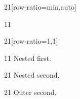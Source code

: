\documentclass[paper=A4]{ropas-poster}
\begin{document}
\begin{postergrid}{2}{1}[row-ratio={min,auto}]
\begin{posterblock}{1}{1}
\begin{postergrid}{2}{1}[row-ratio={1,1}]
\begin{posterblock}{1}{1}
Nested first.
\end{posterblock}
\begin{posterblock}{2}{1}
Nested second.
\end{posterblock}
\end{postergrid}
\end{posterblock}
\begin{posterblock}{2}{1}
Outer second.
\end{posterblock}
\end{postergrid}
\end{document}
